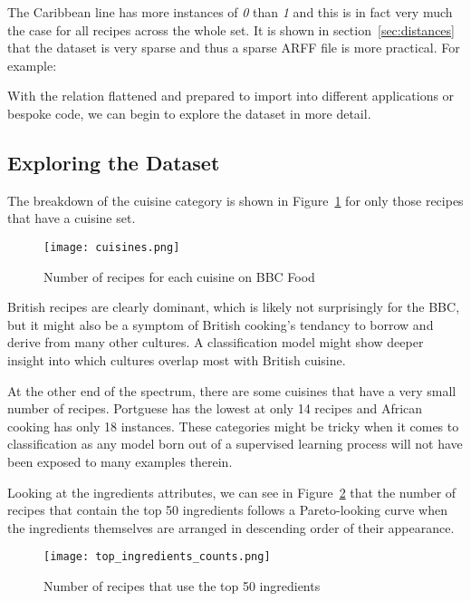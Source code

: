 \documentclass[11pt,a4paper]{article}
\begin{document}


The Caribbean line has more instances of \emph{0} than \emph{1} and this is in
fact very much the case for all recipes across the whole set. It is shown in
section~\ref{sec:distances} that the dataset is very sparse and thus a
sparse ARFF file is more practical. \cite{witten2011data} For example:



With the relation flattened and prepared to import into different applications
or bespoke code, we can begin to explore the dataset in more detail.

\subsection{Exploring the Dataset}
\label{sec:exploring}

The breakdown of the cuisine category is shown in Figure~\ref{cuisines-barchart}
for only those recipes that have a cuisine set.

\begin{figure}[p]
  \texttt{[image: cuisines.png]}
  \caption{Number of recipes for each cuisine on BBC Food\label{cuisines-barchart}}
\end{figure}

British recipes are clearly dominant, which is likely not surprisingly for the
BBC, but it might also be a symptom of British cooking's tendancy to borrow and
derive from
many other cultures. A classification model might show deeper insight into which
cultures overlap most with British cuisine.

At the other end of the spectrum, there are some cuisines that have a very small
number of recipes. Portguese has the lowest at only 14 recipes and African
cooking has only 18 instances. These categories might be tricky when it comes to
classification as any model born out of a supervised learning process will not
have been exposed to many examples therein.

Looking at the ingredients attributes, we can see in Figure~\ref{top-ingredients}
that the number of recipes that contain the top 50 ingredients follows a
Pareto-looking curve when the ingredients themselves are arranged in descending
order of their appearance.

\begin{figure}[p]
  \texttt{[image: top\_ingredients\_counts.png]}
  \caption{Number of recipes that use the top 50 ingredients\label{top-ingredients}}
\end{figure}
\end{document}
